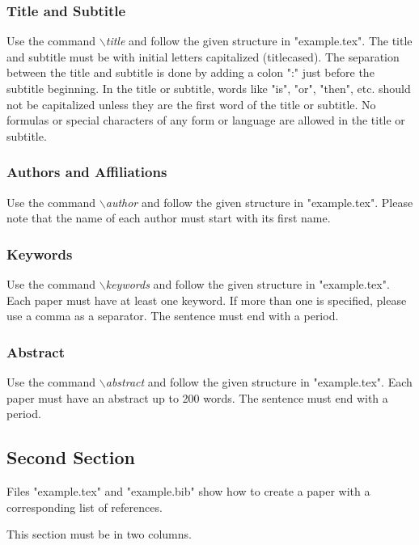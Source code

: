 \documentclass[a4paper,twoside]{article}
\begin{document}
\subsubsection{Title and Subtitle}

Use the command \textit{$\backslash$title} and follow the given structure in "example.tex". The title and subtitle must be with initial letters
capitalized (titlecased). The separation between the title and subtitle is done by adding a colon ":" just before the subtitle beginning. In the title or subtitle, words like "is", "or", "then", etc. should not be capitalized unless they are the first word of the title or subtitle. No formulas or special characters of any form or language are allowed in the title or subtitle.

\subsubsection{Authors and Affiliations}

Use the command \textit{$\backslash$author} and follow the given structure in "example.tex". Please note that the name of each author must start with its first name.

\subsubsection{Keywords}

Use the command \textit{$\backslash$keywords} and follow the given structure in "example.tex". Each paper must have at least one keyword. If more than one is specified, please use a comma as a separator. The sentence must end with a period.

\subsubsection{Abstract}

Use the command \textit{$\backslash$abstract} and follow the given structure in "example.tex".
Each paper must have an abstract up to 200 words. The sentence must end with a period.

\subsection{Second Section}

Files "example.tex" and "example.bib" show how to create a paper with a corresponding list of references.

This section must be in two columns.
\end{document}
